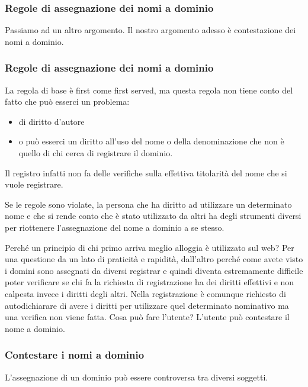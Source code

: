 \subsubsection{Regole di assegnazione dei nomi a dominio}

Passiamo ad un altro argomento. Il nostro argomento adesso è contestazione dei nomi a dominio.

\subsubsection{Regole di assegnazione dei nomi a dominio}

La regola di base è first come first served, ma questa regola non tiene conto del fatto che può esserci un problema:

\begin{itemize}
    \item di diritto d'autore
    \item o può esserci un diritto all'uso del nome o della denominazione che non è quello di chi cerca di registrare il dominio.
\end{itemize}

Il registro infatti non fa delle verifiche sulla effettiva titolarità del nome che si vuole registrare.

Se le regole sono violate, la persona che ha diritto ad utilizzare un determinato nome e che si rende conto che è stato utilizzato da altri ha degli strumenti diversi per riottenere l'assegnazione del nome a dominio a se stesso.

Perché un principio di chi primo arriva meglio alloggia è utilizzato sul web? Per una questione da un lato di praticità e rapidità, dall'altro perché come avete visto i domini sono assegnati da diversi registrar e quindi diventa estremamente difficile poter verificare se chi fa la richiesta di registrazione ha dei diritti effettivi e non calpesta invece i diritti degli altri. Nella registrazione è comunque richiesto di autodichiarare di avere i diritti per utilizzare quel determinato nominativo ma una verifica non viene fatta. Cosa può fare l'utente? L'utente può contestare il nome a dominio.

\subsubsection{Contestare i nomi a dominio}

L'assegnazione di un dominio può essere controversa tra diversi soggetti.

